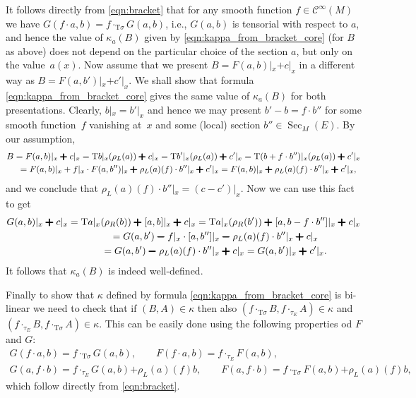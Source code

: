 \documentclass[10pt,a4paper]{amsart}
\newcommand{\Sec}{\operatorname{Sec}}
\newcommand{\plus}{\boldsymbol{\pmb{+}}}
\newcommand{\minus}{\boldsymbol{\pmb{-}}}
\newcommand{\rhoL}{\rho_L} %
\newcommand{\rhoR}{\rho_R}
\newcommand{\T}{\mathrm{T}} %
\newcommand{\Cf}{\mathcal{C}^\infty}
\numberwithin{equation}{section}
\theoremstyle{definition}
\begin{document}
It follows directly from \eqref{eqn:bracket} that for any smooth function $f\in \Cf(M)$ we have $G(f\cdot a,b)=f\cdot_{\T \sigma}G(a,b)$, i.e., $G(a,b)$ is tensorial with respect to $a$, and hence the value of $\kappa_a(B)$ given by \eqref{eqn:kappa_from_bracket_core} (for $B$ as above) does not depend on the particular choice of the section $a$, but only on the value~$a(x)$. Now assume that we present $B=F(a,b)|_x \plus c|_x$ in a different way as $B=F(a,b')|_x\plus c'|_x$. We shall show that formula \eqref{eqn:kappa_from_bracket_core} gives the same value of $\kappa_a(B)$ for both presentations. Clearly, $b|_x=b'|_x$ and hence we may present $b'-b=f\cdot b''$ for some smooth function~$f$ vanishing at~$x$ and some (local) section $b''\in\Sec_M(E)$. By our assumption,
\begin{gather*}
B =F(a,b)|_x\plus c|_x=\T b|_x(\rhoL(a))\plus c|_x=\T b'|_x(\rhoL(a))\plus c'|_x=\T(b+f\cdot b'')|_x(\rhoL(a))\plus c'|_x\\
\hphantom{B}=F(a,b)|_x+f|_x\cdot F(a,b'')|_x\plus\rhoL(a)(f)\cdot b''|_x\plus c'|_x=F(a,b)|_x\plus\rhoL(a)(f)\cdot b''|_x\plus c'|_x,
\end{gather*}
and we conclude that $\rhoL(a)(f)\cdot b''|_x=(c-c')|_x$. Now we can use this fact to get
\begin{gather*}
G(a,b)|_x\plus c|_x =\T a|_x(\rhoR(b))\plus[a,b]|_x\plus c|_x=\T a|_x(\rhoR(b'))\plus[a,b-f\cdot b'']|_x\plus c|_x\\
\hphantom{G(a,b)|_x\plus c|_x}{} =G(a,b')\minus f|_x\cdot[a,b'']|_x\minus \rhoL(a)(f)\cdot b''|_x\plus c|_x\\
\hphantom{G(a,b)|_x\plus c|_x}{} =G(a,b')\minus \rhoL(a)(f)\cdot b''|_x\plus c|_x =G(a,b')|_x\plus c'|_x.
\end{gather*}
It follows that $\kappa_a(B)$ is indeed well-defined.

Finally to show that $\kappa$ defined by formula \eqref{eqn:kappa_from_bracket_core} is bi-linear we need to check that if $(B,A)\in \kappa$ then also $(f\cdot_{\T\sigma}B,f\cdot_{\tau_E}A)\in \kappa$ and $(f\cdot_{\tau_E}B,f\cdot_{\T\sigma}A)\in \kappa$. This can be easily done using the following properties od $F$ and $G$:
\begin{gather}
G(f\cdot a,b)=f\cdot_{\T\sigma} G(a,b), \qquad F(f\cdot a,b)=f\cdot_{\tau_E} F(a,b),\nonumber\\
G(a,f\cdot b)=f\cdot_{\tau_E} G(a,b)\plus\rhoL(a)(f)b,\qquad F(a,f\cdot b)=f\cdot_{\T\sigma} F(a,b)\plus\rhoL(a)(f)b,\label{eqn:rescalling}
\end{gather}
which follow directly from \eqref{eqn:bracket}. %
\end{document}
